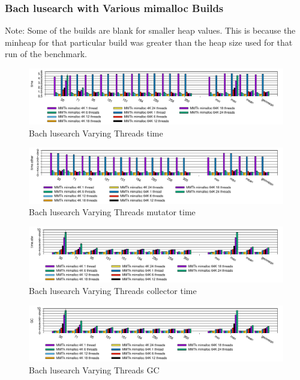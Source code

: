 \documentclass{article}
\begin{document}
\subsubsection{Bach lusearch with Various mimalloc Builds}
Note: Some of the builds are blank for smaller heap values. This is because the minheap for that particular build was greater than the heap size used for that run of the benchmark.
\begin{figure}[H]
    \centering
    \includegraphics[scale=0.59]{../Figures/Bach-lusearch-var-threads-large-heap/Bach-lusearch-var-threads-large-heap-time.pdf}
    \caption{Bach lusearch Varying Threads time}
    \label{Bach lusearch Varying Threads time}
\end{figure}
\begin{figure}[H]
    \centering
    \includegraphics[scale=0.59]{../Figures/Bach-lusearch-var-threads-large-heap/Bach-lusearch-var-threads-large-heap-mutator-time.pdf}
    \caption{Bach lusearch Varying Threads mutator time}
    \label{Bach lusearch Varying Threadsmutator time}
\end{figure}
\begin{figure}[H]
    \centering
    \includegraphics[scale=0.59]{../Figures/Bach-lusearch-var-threads-large-heap/Bach-lusearch-var-threads-large-heap-collector-time.pdf}
    \caption{Bach lusearch Varying Threads collector time}
    \label{Bach lusearch Varying Threads collector time}
\end{figure}
\begin{figure}[H]
    \centering
    \includegraphics[scale=0.59]{../Figures/Bach-lusearch-var-threads-large-heap/Bach-lusearch-var-threads-large-heap-GC.pdf}
    \caption{Bach lusearch Varying Threads GC}
    \label{Bach lusearch Varying Threads GC}
\end{figure}
\end{document}

